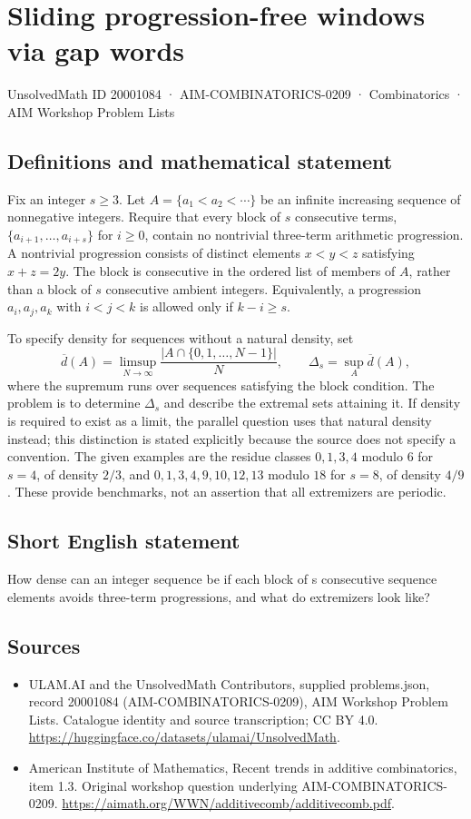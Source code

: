 \documentclass[11pt,a4paper]{article}
\begin{document}
\section*{Sliding progression-free windows via gap words}\label{20001084}
{\small UnsolvedMath ID 20001084 · AIM-COMBINATORICS-0209 · Combinatorics · AIM Workshop Problem Lists}
\subsection{Definitions and mathematical statement}
Fix an integer $s\ge3$. Let $A=\{a_1<a_2<\cdots\}$ be an infinite
increasing sequence of nonnegative integers. Require that every block
of $s$ consecutive terms, $\{a_{i+1},\ldots,a_{i+s}\}$ for $i\ge0$,
contain no nontrivial three-term arithmetic progression.
A nontrivial progression consists of distinct elements $x<y<z$
satisfying $x+z=2y$. The block is consecutive in the ordered list of
members of $A$, rather than a block of $s$ consecutive ambient integers.
Equivalently, a progression $a_i,a_j,a_k$ with $i<j<k$ is allowed
only if $k-i\ge s$.

To specify density for sequences without a natural density, set
\[
 \overline d(A)=\limsup_{N\to\infty}
                \frac{|A\cap\{0,1,\ldots,N-1\}|}{N},\qquad
 \Delta_s=\sup_A\overline d(A),
\]
where the supremum runs over sequences satisfying the block condition.
The problem is to determine $\Delta_s$ and describe the extremal sets
attaining it. If density is required to exist as a limit, the parallel
question uses that natural density instead; this distinction is stated
explicitly because the source does not specify a convention.
The given examples are the residue classes $0,1,3,4$ modulo $6$ for
$s=4$, of density $2/3$, and $0,1,3,4,9,10,12,13$ modulo $18$ for
$s=8$, of density $4/9$. These provide benchmarks, not an assertion
that all extremizers are periodic.
\subsection{Short English statement}
How dense can an integer sequence be if each block of s consecutive sequence elements avoids three-term progressions, and what do extremizers look like?
\subsection{Sources}
\begin{itemize}
\item[S1] ULAM.AI and the UnsolvedMath Contributors, supplied problems.json, record 20001084 (AIM-COMBINATORICS-0209), AIM Workshop Problem Lists. Catalogue identity and source transcription; CC BY 4.0.
\url{https://huggingface.co/datasets/ulamai/UnsolvedMath}.
\item[S2] American Institute of Mathematics, Recent trends in additive combinatorics, item 1.3. Original workshop question underlying AIM-COMBINATORICS-0209.
\url{https://aimath.org/WWN/additivecomb/additivecomb.pdf}.
\end{itemize}
\end{document}

